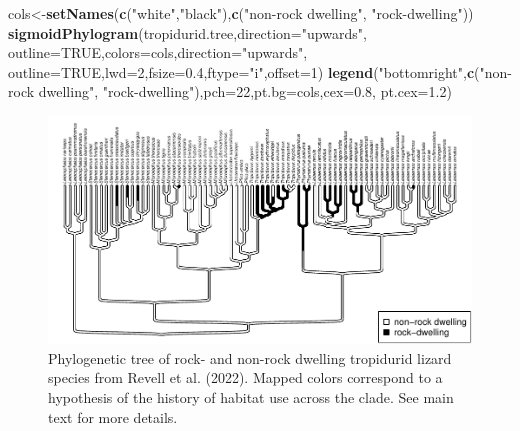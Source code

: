 \documentclass[fleqn,10pt,lineno]{wlpeerj} %
\newenvironment{Shaded}{\begin{snugshade}}{\end{snugshade}}
\newcommand{\AttributeTok}[1]{\textcolor[rgb]{0.13,0.29,0.53}{#1}}
\newcommand{\ConstantTok}[1]{\textcolor[rgb]{0.56,0.35,0.01}{#1}}
\newcommand{\DecValTok}[1]{\textcolor[rgb]{0.00,0.00,0.81}{#1}}
\newcommand{\FloatTok}[1]{\textcolor[rgb]{0.00,0.00,0.81}{#1}}
\newcommand{\FunctionTok}[1]{\textcolor[rgb]{0.13,0.29,0.53}{\textbf{#1}}}
\newcommand{\NormalTok}[1]{#1}
\newcommand{\OtherTok}[1]{\textcolor[rgb]{0.56,0.35,0.01}{#1}}
\newcommand{\StringTok}[1]{\textcolor[rgb]{0.31,0.60,0.02}{#1}}
\begin{document}
\begin{Shaded}
\begin{Highlighting}[]
\NormalTok{cols}\OtherTok{\textless{}{-}}\FunctionTok{setNames}\NormalTok{(}\FunctionTok{c}\NormalTok{(}\StringTok{"white"}\NormalTok{,}\StringTok{"black"}\NormalTok{),}\FunctionTok{c}\NormalTok{(}\StringTok{"non{-}rock dwelling"}\NormalTok{,}
  \StringTok{"rock{-}dwelling"}\NormalTok{))}
\FunctionTok{sigmoidPhylogram}\NormalTok{(tropidurid.tree,}\AttributeTok{direction=}\StringTok{"upwards"}\NormalTok{,}
  \AttributeTok{outline=}\ConstantTok{TRUE}\NormalTok{,}\AttributeTok{colors=}\NormalTok{cols,}\AttributeTok{direction=}\StringTok{"upwards"}\NormalTok{,}
  \AttributeTok{outline=}\ConstantTok{TRUE}\NormalTok{,}\AttributeTok{lwd=}\DecValTok{2}\NormalTok{,}\AttributeTok{fsize=}\FloatTok{0.4}\NormalTok{,}\AttributeTok{ftype=}\StringTok{"i"}\NormalTok{,}\AttributeTok{offset=}\DecValTok{1}\NormalTok{)}
\FunctionTok{legend}\NormalTok{(}\StringTok{"bottomright"}\NormalTok{,}\FunctionTok{c}\NormalTok{(}\StringTok{"non{-}rock dwelling"}\NormalTok{,}
  \StringTok{"rock{-}dwelling"}\NormalTok{),}\AttributeTok{pch=}\DecValTok{22}\NormalTok{,}\AttributeTok{pt.bg=}\NormalTok{cols,}\AttributeTok{cex=}\FloatTok{0.8}\NormalTok{,}
  \AttributeTok{pt.cex=}\FloatTok{1.2}\NormalTok{)}
\end{Highlighting}
\end{Shaded}

\begin{figure}
\includegraphics[width=1\linewidth]{Revell.phytools-v2_peerj_files/figure-latex/trop-tree-1} \caption{Phylogenetic tree of rock- and non-rock dwelling tropidurid lizard species from Revell et al. (2022). Mapped colors correspond to a hypothesis of the history of habitat use across the clade. See main text for more details.}\label{fig:trop-tree}
\end{figure}
\end{document}
